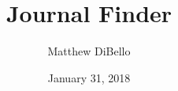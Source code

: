\documentclass[11pt]{article}
\title{Journal Finder\vspace{-2ex}}
\author{Matthew DiBello\vspace{-2ex}}
\date{January 31, 2018\vspace{-2ex}}
\begin{document}
\maketitle

\nocite{*}

\printbibliography
\end{document}

